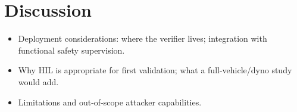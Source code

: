 \section{Discussion}
\label{sec:discussion}
\begin{itemize}
    \item Deployment considerations: where the verifier lives; integration with functional safety supervision.
    \item Why HIL is appropriate for first validation; what a full-vehicle/dyno study would add.
    \item Limitations and out-of-scope attacker capabilities.
\end{itemize}

